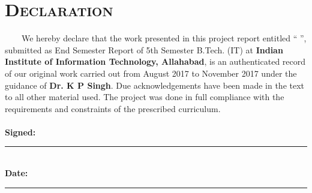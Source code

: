 \documentclass{report}
\begin{document}
\pagebreak
{\section*{ \quad \quad \quad \quad \quad \quad \quad \quad \quad \quad \quad \quad  \Huge \scshape Declaration}
\vspace{2.0cm}
\ \ \ \ \LARGE We hereby declare that the work presented in this project re\vspace{0.5cm}port entitled “ \textbf{\textit{\fontsize{20}{24}}} ”, submitted as End Semester Report of 5th \vspace{0.5cm} Semester B.Tech. (IT) at \textbf{Indian Institute of Information Tech\vspace{0.5cm}nology, Allahabad}, is an authenticated record of our  original \vspace{0.5cm} work carried out from August 2017 to November 2017 under the \vspace{0.5cm} guidance of \textbf{Dr. K P Singh}. Due acknowledgements have been \vspace{0.5cm} made in the text to all other material used. The project was done \vspace{0.5cm} in full compliance with the requirements and constraints of the \vspace{0.5cm} prescribed curriculum.\\
\linebreak
\linebreak
\linebreak
\linebreak
\linebreak
\vspace{2.5cm}\\
\noindent \textbf{Signed:}\\
\rule[0.5em]{25em}{0.5pt} %
\vspace{1.5cm}\\
\noindent \textbf{Date:}\\
\rule[0.5em]{25em}{0.5pt} %
}


\end{document}
